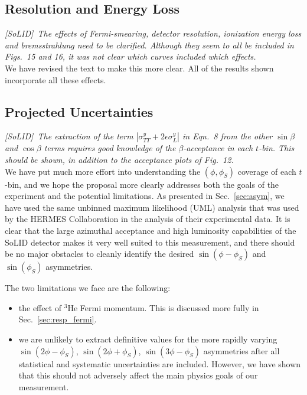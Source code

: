 \subsection{Resolution and Energy Loss}

{\it [SoLID]\ The effects of Fermi-smearing, detector resolution, ionization
  energy loss and bremsstrahlung need to be clarified.  Although they seem to
  all be included in Figs.~15 and 16, it was not clear which curves included
  which effects.}\\[0.2ex]

We have revised the text to make this more clear.  All of the results shown
incorporate all these effects.

\subsection{Projected Uncertainties}

{\it [SoLID]\ The extraction of the term $|\sigma^y_{TT}+2\epsilon\sigma^y_L|$
  in Eqn.~8 from the other $\sin\beta$ and $\cos\beta$ terms requires good
  knowledge of the $\beta$-acceptance in each $t$-bin.  This should be shown,
  in addition to the acceptance plots of Fig.~12.}\\[0.2ex]

We have put much more effort into understanding the $(\phi,\phi_S)$ coverage of
each $t$-bin, and we hope the proposal more clearly addresses both
the goals of the experiment and the potential limitations.  As presented in
Sec.~\ref{sec:asym}, we have used the same unbinned maximum likelihood (UML)
analysis that was used by the HERMES Collaboration in the analysis of their
experimental data.  It is clear that the large azimuthal acceptance and high
luminosity capabilities of the SoLID detector makes it very well suited to this
measurement, and there should be no major obstacles to cleanly identify the
desired $\sin(\phi-\phi_S)$ and $\sin(\phi_S)$ asymmetries.

The two limitations we face are the following:
\begin{itemize}
\item{the effect of $^3$He Fermi momentum.  This is discussed more fully in
  Sec.~\ref{sec:resp_fermi}.}
\item{we are unlikely to extract definitive values for the more rapidly varying
  $\sin(2\phi-\phi_{S})$, $\sin(2\phi+\phi_{S})$, $\sin(3\phi-\phi_{S})$
  asymmetries after all statistical and systematic uncertainties are included.
  However, we have shown that this should not adversely affect the main physics
  goals of our measurement.}
\end{itemize}

